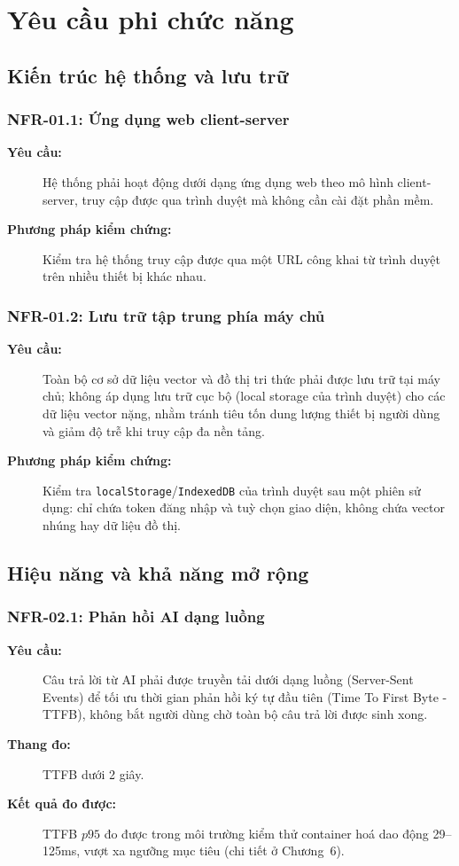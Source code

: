 \section{Yêu cầu phi chức năng}
\subsection{Kiến trúc hệ thống và lưu trữ}
\subsubsection{NFR-01.1: Ứng dụng web client-server}
\begin{description}
    \item[\textbf{Yêu cầu:}] Hệ thống phải hoạt động dưới dạng ứng dụng web theo mô hình client-server, truy cập được qua trình duyệt mà không cần cài đặt phần mềm.
    \item[\textbf{Phương pháp kiểm chứng:}] Kiểm tra hệ thống truy cập được qua một URL công khai từ trình duyệt trên nhiều thiết bị khác nhau.
\end{description}
\subsubsection{NFR-01.2: Lưu trữ tập trung phía máy chủ}
\begin{description}
    \item[\textbf{Yêu cầu:}] Toàn bộ cơ sở dữ liệu vector và đồ thị tri thức phải được lưu trữ tại máy chủ; không áp dụng lưu trữ cục bộ (local storage của trình duyệt) cho các dữ liệu vector nặng, nhằm tránh tiêu tốn dung lượng thiết bị người dùng và giảm độ trễ khi truy cập đa nền tảng.
    \item[\textbf{Phương pháp kiểm chứng:}] Kiểm tra \texttt{localStorage}/\texttt{IndexedDB} của trình duyệt sau một phiên sử dụng: chỉ chứa token đăng nhập và tuỳ chọn giao diện, không chứa vector nhúng hay dữ liệu đồ thị.
\end{description}

\subsection{Hiệu năng và khả năng mở rộng}
\subsubsection{NFR-02.1: Phản hồi AI dạng luồng}
\begin{description}
    \item[\textbf{Yêu cầu:}] Câu trả lời từ AI phải được truyền tải dưới dạng luồng (Server-Sent Events) để tối ưu thời gian phản hồi ký tự đầu tiên (Time To First Byte - TTFB), không bắt người dùng chờ toàn bộ câu trả lời được sinh xong.
    \item[\textbf{Thang đo:}] TTFB dưới 2 giây.
    \item[\textbf{Kết quả đo được:}] TTFB $p95$ đo được trong môi trường kiểm thử container hoá dao động 29--125\;ms, vượt xa ngưỡng mục tiêu (chi tiết ở Chương~6).
\end{description}
